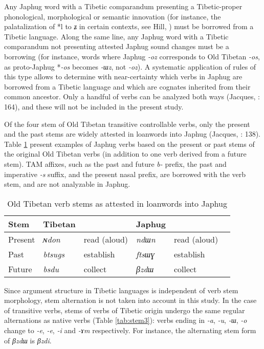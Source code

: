 \documentclass[oneside,a4paper,11pt]{article}
\newcommand{\ipa}[1]{{\phon\textit{\mbox{#1}}}} %
\begin{document}
Any Japhug word with a Tibetic comparandum presenting a Tibetic-proper phonological, morphological or semantic innovation (for instance, the palatalization of *l to \ipa{ʑ} in certain contexts, see Hill, \citeyear{hill13laterals}) must be borrowed from a Tibetic language. Along the same line, any Japhug word with a Tibetic comparandum not presenting attested Japhug sound changes must be a borrowing (for instance, words where Japhug \ipa{-oz} corresponds to Old Tibetan \ipa{-os}, as proto-Japhug *\ipa{-os} becomes \ipa{-ɯz}, not \ipa{-oz}). A systematic application of rules of this type allows to determine with near-certainty which verbs in Japhug are borrowed from a Tibetic language and which are cognates inherited from their common ancestor. Only a handful of verbs can be analyzed both ways (Jacques, \citeyear{jacques04these}: 164), and these will not be included in the present study. 

Of the four stem of Old Tibetan transitive controllable verbs, only the present and the past stems are widely attested in loanwords into Japhug (Jacques, \citeyear{jacques04these}: 138). Table  \ref{tab:four.stems} present examples of Japhug verbs based on the present or past stems of the original Old Tibetan verbs (in addition to one verb derived from a future stem). TAM affixes, such as the past and future \ipa{b-} prefix, the past and imperative \ipa{-s} suffix, and the present nasal prefix, are borrowed with the verb stem, and are not analyzable in Japhug.

\begin{table}[H]
\caption{Old Tibetan verb stems as attested in loanwords into Japhug} \label{tab:four.stems} \centering
\begin{tabular}{llllll}
\toprule
Stem&Tibetan && Japhug &\\
\midrule
Present & \ipa{ɴdon} & read (aloud) & \ipa{ndɯn} & read (aloud)&\\
Past  & \ipa{btsugs} & establish & \ipa{ftsɯɣ} &establish&\\
Future & \ipa{bsdu} & collect & \ipa{βzdɯ} & collect\\
\bottomrule
\end{tabular}
\end{table}

Since argument structure in Tibetic languages is independent of verb stem morphology, stem alternation is not taken into account in this study. In the case of transitive verbs, stems of verbs of Tibetic origin undergo the same regular alternations  as native verbs (Table \ref{tab:stem3}): verbs ending in \ipa{-a}, \ipa{-u}, \ipa{-ɯ}, \ipa{-o} change to \ipa{-e}, \ipa{-e}, \ipa{-i} and \ipa{-ɤm} respectively. For instance, the alternating stem form of \ipa{βzdɯ} is \ipa{βzdi}. 
\end{document}
